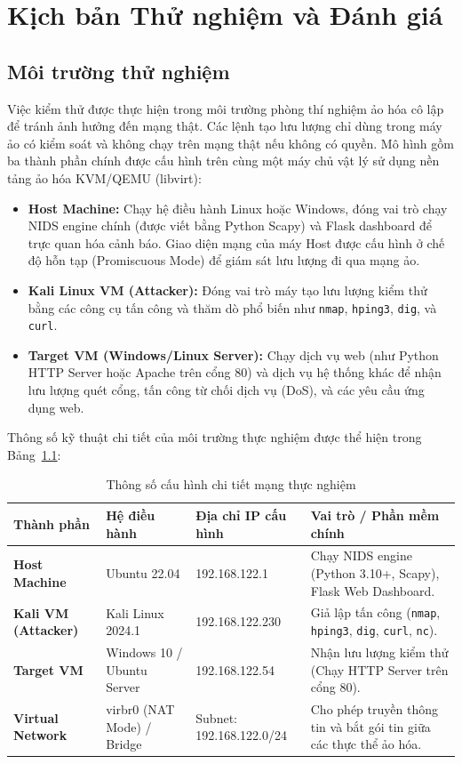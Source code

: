 \chapter{Kịch bản Thử nghiệm và Đánh giá}

\section{Môi trường thử nghiệm}
Việc kiểm thử được thực hiện trong môi trường phòng thí nghiệm ảo hóa cô lập để tránh ảnh hưởng đến mạng thật. Các lệnh tạo lưu lượng chỉ dùng trong máy ảo có kiểm soát và không chạy trên mạng thật nếu không có quyền. Mô hình gồm ba thành phần chính được cấu hình trên cùng một máy chủ vật lý sử dụng nền tảng ảo hóa KVM/QEMU (libvirt):

\begin{itemize}
    \item \textbf{Host Machine:} Chạy hệ điều hành Linux hoặc Windows, đóng vai trò chạy NIDS engine chính (được viết bằng Python Scapy) và Flask dashboard để trực quan hóa cảnh báo. Giao diện mạng của máy Host được cấu hình ở chế độ hỗn tạp (Promiscuous Mode) để giám sát lưu lượng đi qua mạng ảo.
    \item \textbf{Kali Linux VM (Attacker):} Đóng vai trò máy tạo lưu lượng kiểm thử bằng các công cụ tấn công và thăm dò phổ biến như \texttt{nmap}, \texttt{hping3}, \texttt{dig}, và \texttt{curl}.
    \item \textbf{Target VM (Windows/Linux Server):} Chạy dịch vụ web (như Python HTTP Server hoặc Apache trên cổng 80) và dịch vụ hệ thống khác để nhận lưu lượng quét cổng, tấn công từ chối dịch vụ (DoS), và các yêu cầu ứng dụng web.
\end{itemize}

Thông số kỹ thuật chi tiết của môi trường thực nghiệm được thể hiện trong Bảng~\ref{tab:test_env_specs}:

\begin{table}[H]
    \centering
    \small
    \renewcommand{\arraystretch}{1.25}
    \begin{tabular}{|p{3cm}|p{4cm}|p{3.5cm}|p{4.5cm}|}
        \hline
        \textbf{Thành phần} & \textbf{Hệ điều hành} & \textbf{Địa chỉ IP cấu hình} & \textbf{Vai trò / Phần mềm chính} \\ \hline
        \textbf{Host Machine} & Ubuntu 22.04 & 192.168.122.1 & Chạy NIDS engine (Python 3.10+, Scapy), Flask Web Dashboard. \\ \hline
        \textbf{Kali VM (Attacker)} & Kali Linux 2024.1 & 192.168.122.230 & Giả lập tấn công (\texttt{nmap}, \texttt{hping3}, \texttt{dig}, \texttt{curl}, \texttt{nc}). \\ \hline
        \textbf{Target VM} & Windows 10 / Ubuntu Server & 192.168.122.54 & Nhận lưu lượng kiểm thử (Chạy HTTP Server trên cổng 80). \\ \hline
        \textbf{Virtual Network} & virbr0 (NAT Mode) / Bridge & Subnet: 192.168.122.0/24 & Cho phép truyền thông tin và bắt gói tin giữa các thực thể ảo hóa. \\ \hline
    \end{tabular}
    \caption{Thông số cấu hình chi tiết mạng thực nghiệm}
    \label{tab:test_env_specs}
\end{table}

